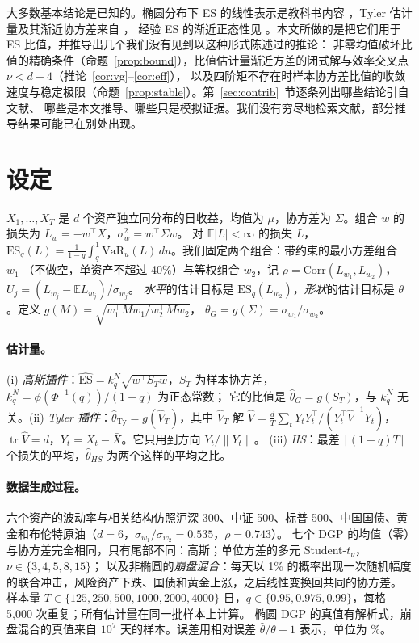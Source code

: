 \documentclass[11pt,UTF8]{ctexart}
\newcommand{\E}{\mathbb{E}}
\newcommand{\ES}{\mathrm{ES}}
\newcommand{\tr}{\operatorname{tr}}
\begin{document}
大多数基本结论是已知的。椭圆分布下 ES 的线性表示是教科书内容 \citep{mcneil2015}，Tyler 估计量及其渐近协方差来自 \citet{tyler1987}，
经验 ES 的渐近正态性见 \citet{chen2008}。本文所做的是把它们用于 ES 比值，并推导出几个我们没有见到以这种形式陈述过的推论：
非零均值破坏比值的精确条件（命题~\ref{prop:bound}），比值估计量渐近方差的闭式解与效率交叉点 $\nu<d+4$（推论~\ref{cor:vg}--\ref{cor:eff}），
以及四阶矩不存在时样本协方差比值的收敛速度与稳定极限（命题~\ref{prop:stable}）。第~\ref{sec:contrib}~节逐条列出哪些结论引自文献、
哪些是本文推导、哪些只是模拟证据。我们没有穷尽地检索文献，部分推导结果可能已在别处出现。

\section{设定}\label{sec:setting}

$X_1,\dots,X_T$ 是 $d$ 个资产独立同分布的日收益，均值为 $\mu$，协方差为 $\Sigma$。组合 $w$ 的损失为 $L_w=-w^\top X$，$\sigma_w^2=w^\top\Sigma w$。
对 $\E|L|<\infty$ 的损失 $L$，$\ES_q(L)=\frac1{1-q}\int_q^1\mathrm{VaR}_u(L)\,du$。我们固定两个组合：带约束的最小方差组合 $w_1$
（不做空，单资产不超过 40\%）与等权组合 $w_2$，记 $\rho=\mathrm{Corr}(L_{w_1},L_{w_2})$，$U_j=(L_{w_j}-\E L_{w_j})/\sigma_{w_j}$。
\emph{水平}的估计目标是 $\ES_q(L_{w_2})$，\emph{形状}的估计目标是 $\theta$。定义 $g(M)=\sqrt{w_1^\top Mw_1/w_2^\top Mw_2}$，
$\theta_G=g(\Sigma)=\sigma_{w_1}/\sigma_{w_2}$。

\paragraph{估计量。}
(i) \emph{高斯插件}：$\widehat{\ES}=k^N_q\sqrt{w^\top S_Tw}$，$S_T$ 为样本协方差，$k^N_q=\phi(\Phi^{-1}(q))/(1-q)$ 为正态常数；
它的比值是 $\hat\theta_G=g(S_T)$，与 $k^N_q$ 无关。(ii) \emph{Tyler 插件}：$\hat\theta_{\mathrm{Ty}}=g(\hat V_T)$，其中 $\hat V_T$ 解
$\hat V=\frac dT\sum_t Y_tY_t^\top/(Y_t^\top\hat V^{-1}Y_t)$，$\tr\hat V=d$，$Y_t=X_t-\bar X$。它只用到方向 $Y_t/\|Y_t\|$。
(iii) \emph{HS}：最差 $\lceil(1-q)T\rceil$ 个损失的平均，$\hat\theta_{HS}$ 为两个这样的平均之比。

\paragraph{数据生成过程。}
六个资产的波动率与相关结构仿照沪深 300、中证 500、标普 500、中国国债、黄金和布伦特原油（$d=6$，$\sigma_{w_1}/\sigma_{w_2}=0.535$，$\rho=0.743$）。
七个 DGP 的均值（零）与协方差完全相同，只有尾部不同：高斯；单位方差的多元 Student-$t_\nu$，$\nu\in\{3,4,5,8,15\}$；
以及非椭圆的\emph{崩盘混合}：每天以 1\% 的概率出现一次随机幅度的联合冲击，风险资产下跌、国债和黄金上涨，之后线性变换回共同的协方差。
样本量 $T\in\{125,250,500,1000,2000,4000\}$ 日，$q\in\{0.95,0.975,0.99\}$，每格 5{,}000 次重复；所有估计量在同一批样本上计算。
椭圆 DGP 的真值有解析式，崩盘混合的真值来自 $10^7$ 天的样本。误差用相对误差 $\hat\theta/\theta-1$ 表示，单位为 \%。
\end{document}
